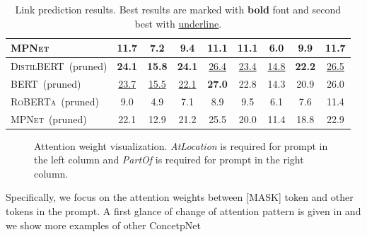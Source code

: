 \begin{table}[t!]
\begin{tabular}{l|cccc|cccc}
		\textsc{MPNet} &11.7 &7.2 &9.4 &11.1 &11.1 &6.0 &9.9 &11.7 \\
		\midrule
		\textsc{DistilBERT}~(pruned) &\textbf{24.1} &\textbf{15.8} &\textbf{24.1} &\underline{26.4} &\underline{23.4} &\underline{14.8} &\textbf{22.2} &\underline{26.5} \\
		\textsc{BERT}~(pruned) &\underline{23.7} &\underline{15.5} &\underline{22.1} &\textbf{27.0} &22.8 &14.3 &20.9 &26.0 \\
		\textsc{RoBERTa}~(pruned) &9.0 &4.9 &7.1 &8.9 &9.5 &6.1 &7.6 &11.4 \\
		\textsc{MPNet}~(pruned) &22.1 &12.9 &21.2 &25.5 &20.0 &11.4 &18.8 &22.9 \\
		\bottomrule
	\end{tabular}
	\caption{Link prediction results. Best results are marked with \textbf{bold} font and second best with \underline{underline}.}
	\label{table:linkprediction}
\end{table}
\begin{figure}[th]
	\centering
	\caption{Attention weight visualization. \textit{AtLocation} is required for prompt in the left column and \textit{PartOf} is required for prompt in the right column.} \label{fig:attention}
\end{figure}
Specifically, we focus on the attention weights between [MASK] token and 
other tokens in the prompt. A first glance of change of attention pattern 
is given in  and we show more examples of other ConcetpNet 
